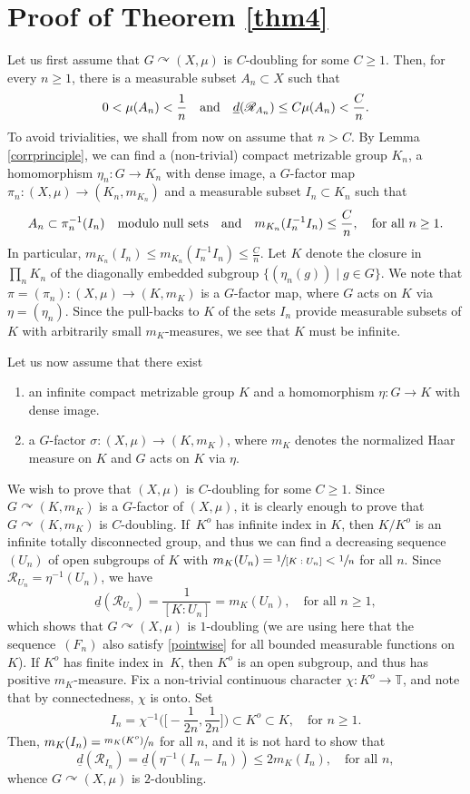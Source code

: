 \documentclass[JEP,XML,SOM,Unicode]{cedram}
\let\mathcal\mathscr
\newcommand{\cR}{\mathcal{R}}
\newcommand{\bT}{\mathbb{T}}
\newcommand{\qand}{\quad\textup{and}\quad}
\let\acts\curvearrowright
\theoremstyle{plain}
\theoremstyle{definition}
\begin{document}
\section{Proof of Theorem \ref{thm4}}

Let us first assume that $G \acts (X,\mu)$ is $C$\nobreakdash-doubling for some $C \geq 1$. Then, for every $n \geq 1$, there is
a measurable subset $A_n \subset X$ such that
\[
0 < \mu(A_n) < \frac{1}{n} \qand \underline{d}(\cR_{A_n}) \leq C\mu(A_n) < \frac{C}{n}.
\]
To avoid trivialities, we shall from now on assume that $n > C$. By Lemma \ref{corrprinciple}, we can find a (non-trivial) compact metrizable
group $K_n$, a homomorphism $\eta_n : G \to K_n$ with dense image, a $G$-factor map $\pi_n : (X,\mu) \to (K_n,m_{K_n})$ and
a measurable subset $I_n \subset K_n$ such that
\[
A_n \subset \pi_n^{-1}(I_n) \quad \textrm{modulo null sets} \qand m_{K_n}(I_n^{-1} I_n) \leq \frac{C}{n}, \quad \textrm{for all $n \geq 1$}.
\]
In particular, $m_{K_n}(I_n) \leq m_{K_n}(I_n^{-1} I_n) \leq \frac{C}{n}$. Let $K$ denote the closure in $\prod_n K_n$ of the diagonally embedded
subgroup $\{ (\eta_n(g)) \mid  g \in G\}$. We note that $\pi = (\pi_n) : (X,\mu) \to (K,m_K)$ is a $G$-factor map, where $G$
acts on $K$ via $\eta = (\eta_n)$. Since the pull-backs to $K$ of the sets $I_n$ provide measurable subsets of $K$ with arbitrarily small $m_K$-measures, we see that $K$ must be infinite.

Let us now assume that there exist
\begin{enumerate}
\item
an infinite compact metrizable group $K$ and a homomorphism $\eta : G \to K$ with dense image.
\item
a $G$-factor $\sigma : (X,\mu) \to (K,m_K)$, where $m_K$ denotes the normalized Haar measure on $K$
and $G$ acts on $K$ via $\eta$.
\end{enumerate}
We wish to prove that $(X,\mu)$ is $C$\nobreakdash-doubling for some $C \geq 1$. Since $G \acts (K,m_K)$ is a $G$-factor of $(X,\mu)$, it is clearly
enough to prove that $G \acts (K,m_K)$ is $C$\nobreakdash-doubling. If~$K^o$ has infinite index in $K$, then $K/K^o$ is an infinite totally disconnected group,
and thus we can find a decreasing sequence $(U_n)$ of open subgroups of $K$ with $m_K(U_n) = \sfrac{1}{[K : U_n]} < \sfrac{1}{n}$ for all $n$.
Since $\cR_{U_n} = \eta^{-1}(U_n)$, we have
\[
\underline{d}(\cR_{U_n}) = \frac{1}{[K : U_n]} = m_K(U_n), \quad \textrm{for all $n \geq 1$},
\]
which shows that $G \acts (X,\mu)$ is $1$\nobreakdash-doubling (we are using here that the sequence~$(F_n)$ also satisfy \eqref{pointwise} for all bounded
measurable functions on $K$). If $K^o$ has finite index in~$K$, then $K^o$ is an open subgroup, and thus has
positive $m_K$-measure. Fix a non-trivial continuous character $\chi : K^o \to \bT$, and note that by connectedness, $\chi$ is onto. Set
\[
I_n = \chi^{-1}\Big(\Big[-\frac{1}{2n},\frac{1}{2n}\Big]\Big) \subset K^o \subset K, \quad \textrm{for $n \geq 1$}.
\]
Then, $m_K(I_n) = \sfrac{m_K(K^o)}{n}$ for all $n$, and it is not hard to show that
\[
\underline{d}(\cR_{I_n}) = \underline{d}(\eta^{-1}(I_n - I_n)) \leq 2 m_K(I_n), \quad \textrm{for all $n$},
\]
whence $G \acts (X,\mu)$ is $2$\nobreakdash-doubling.




\end{document}
